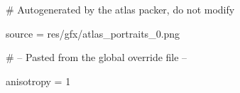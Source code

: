 # Autogenerated by the atlas packer, do not modify

source = res/gfx/atlas_portraits_0.png

# -- Pasted from the global override file --

anisotropy = 1
